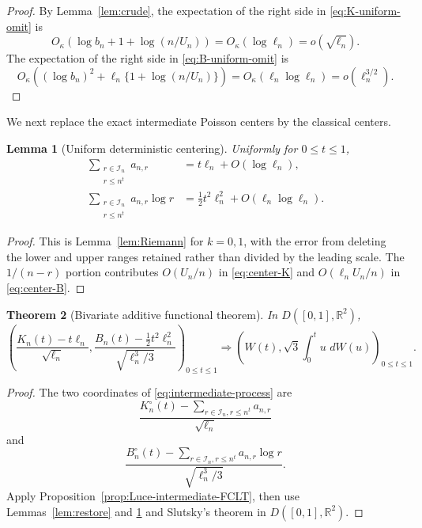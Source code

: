 \documentclass[11pt]{article}
\newtheorem{theorem}{Theorem}[section]
\newtheorem{lemma}[theorem]{Lemma}
\theoremstyle{definition}
\theoremstyle{remark}
\newcommand{\dd}{\,d}
\newcommand{\cI}{\mathcal I}
\newcommand{\R}{\mathbb R}
\begin{document}
\begin{proof}
By Lemma~\ref{lem:crude}, the expectation of the right side in
\eqref{eq:K-uniform-omit} is
\[
 O_\kappa(\log b_n+1+\log(n/U_n))
 =O_\kappa(\log\ell_n)=o(\sqrt{\ell_n}).
\]
The expectation of the right side in \eqref{eq:B-uniform-omit} is
\[
 O_\kappa((\log b_n)^2+\ell_n\{1+\log(n/U_n)\})
 =O_\kappa(\ell_n\log\ell_n)
 =o(\ell_n^{3/2}).
\]
\end{proof}

We next replace the exact intermediate Poisson centers by the classical
centers.

\begin{lemma}[Uniform deterministic centering]
\label{lem:centering}
Uniformly for $0\le t\le1$,
\begin{align}
 \sum_{\substack{r\in\cI_n\\r\le n^t}}a_{n,r}
 &=t\ell_n+O(\log\ell_n),
 \label{eq:center-K}\\
 \sum_{\substack{r\in\cI_n\\r\le n^t}}a_{n,r}\log r
 &=\frac12t^2\ell_n^2+O(\ell_n\log\ell_n).
 \label{eq:center-B}
\end{align}
\end{lemma}

\begin{proof}
This is Lemma~\ref{lem:Riemann} for $k=0,1$, with the error from deleting the
lower and upper ranges retained rather than divided by the leading scale.
The $1/(n-r)$ portion contributes $O(U_n/n)$ in \eqref{eq:center-K} and
$O(\ell_nU_n/n)$ in \eqref{eq:center-B}.
\end{proof}

\begin{theorem}[Bivariate additive functional theorem]
\label{thm:additive-functional}
In $D([0,1],\R^2)$,
\begin{equation}\label{eq:additive-functional}
 \boxed{
 \left(
 \frac{K_n(t)-t\ell_n}{\sqrt{\ell_n}},
 \frac{B_n(t)-\frac12t^2\ell_n^2}{\sqrt{\ell_n^3/3}}
 \right)_{0\le t\le1}
 \Rightarrow
 \left(
 W(t),\sqrt3\int_0^t u\,\dd W(u)
 \right)_{0\le t\le1}.}
\end{equation}
\end{theorem}

\begin{proof}
The two coordinates of \eqref{eq:intermediate-process} are
\[
 \frac{K_n^\circ(t)-\sum_{r\in\cI_n,r\le n^t}a_{n,r}}
      {\sqrt{\ell_n}}
\]
and
\[
 \frac{B_n^\circ(t)-\sum_{r\in\cI_n,r\le n^t}a_{n,r}\log r}
      {\sqrt{\ell_n^3/3}}.
\]
Apply Proposition~\ref{prop:Luce-intermediate-FCLT}, then use
Lemmas~\ref{lem:restore} and \ref{lem:centering} and Slutsky's theorem in
$D([0,1],\R^2)$.
\end{proof}
\end{document}
